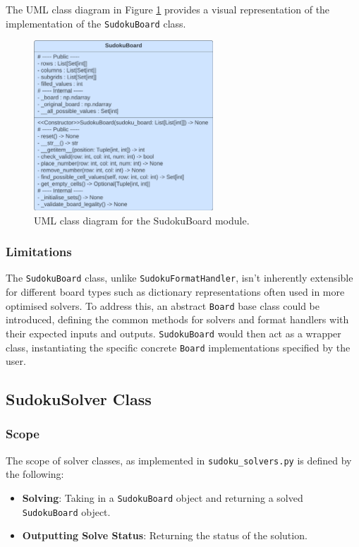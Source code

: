 \documentclass[11pt]{article}
\begin{document}
The UML class diagram in Figure \ref{fig:sudoku_board_uml} provides a visual representation of the implementation of the \texttt{SudokuBoard} class.

\begin{figure}[H]
    \centering
    \includegraphics[width=0.6\textwidth]{figs/UML_sudoku_board.png}
    \caption{UML class diagram for the SudokuBoard module.}
    \label{fig:sudoku_board_uml}
\end{figure}
 
\subsubsection{Limitations}
The \texttt{SudokuBoard} class, unlike \texttt{SudokuFormatHandler}, isn't inherently extensible for different board types such as dictionary representations often used in more optimised solvers. To address this, an abstract \texttt{Board} base class could be introduced, defining the common methods for solvers and format handlers with their expected inputs and outputs. \texttt{SudokuBoard} would then act as a wrapper class, instantiating the specific concrete \texttt{Board} implementations specified by the user.


\subsection{SudokuSolver Class}
\subsubsection{Scope}
The scope of solver classes, as implemented in \texttt{sudoku\_solvers.py}
is defined by the following:
\begin{itemize}
    \item \textbf{Solving}: Taking in a \texttt{SudokuBoard} object and returning a solved \texttt{SudokuBoard} object.
    \item \textbf{Outputting Solve Status}: Returning the status of the solution.
\end{itemize}
\end{document}
